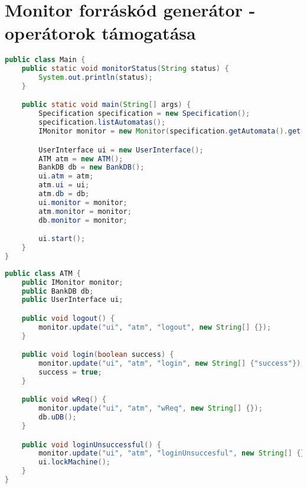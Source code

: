 \clearpage\section{Monitor forráskód generátor - operátorok támogatása}

\begin{lstlisting}[language=java, frame=single, float=ht!, caption={7.1. szcenárióhoz tartozó \textit{Main} osztály.},captionpos=b]
public class Main {
	public static void monitorStatus(String status) {
		System.out.println(status);
	}

	public static void main(String[] args) {
		Specification specification = new Specification();
		specification.listAutomatas();
		IMonitor monitor = new Monitor(specification.getAutomata().get(0));

		UserInterface ui = new UserInterface();
		ATM atm = new ATM();
		BankDB db = new BankDB();
		ui.atm = atm;
		atm.ui = ui;
		atm.db = db;
		ui.monitor = monitor;
		atm.monitor = monitor;
		db.monitor = monitor;

		ui.start();
	}
}
\end{lstlisting}

\begin{lstlisting}[language=java, frame=single, float=ht!, caption={7.1. szcenárióhoz tartozó rendszer \textit{ATM} \textit{Java} osztálya.},captionpos=b]
public class ATM {
	public IMonitor monitor;
	public BankDB db;
	public UserInterface ui;

	public void logout() {
		monitor.update("ui", "atm", "logout", new String[] {});
	}

	public void login(boolean success) {
		monitor.update("ui", "atm", "login", new String[] {"success"});
		success = true;
	}

	public void wReq() {
		monitor.update("ui", "atm", "wReq", new String[] {});
		db.uDB();
	}

	public void loginUnsuccessful() {
		monitor.update("ui", "atm", "loginUnsuccesful", new String[] {});
		ui.lockMachine();
	}
}
\end{lstlisting}

